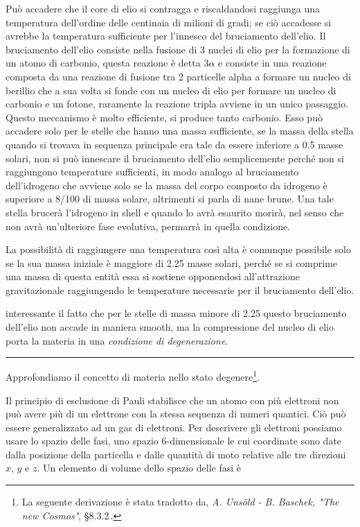 Può accadere che il core di elio si contragga e riscaldandosi raggiunga una temperatura dell'ordine delle centinaia di milioni di gradi; se ciò accadesse si avrebbe la temperatura sufficiente per l'innesco del bruciamento dell'elio. Il bruciamento dell'elio consiste nella fusione di 3 nuclei di elio per la formazione di un atomo di carbonio, questa reazione è detta $3 \alpha$ e consiste in una reazione composta da una reazione di fusione tra 2 particelle alpha a formare un nucleo di berillio che a sua volta si fonde con un nucleo di elio per formare un nucleo di carbonio e un fotone, raramente la reazione tripla avviene in un unico passaggio. Questo meccanismo è molto efficiente, si produce tanto carbonio. Esso può accadere solo per le stelle che hanno una massa sufficiente, se la massa della stella quando si trovava in sequenza principale era tale da essere inferiore a 0.5 masse solari, non si può innescare il bruciamento dell'elio semplicemente perché non si raggiungono temperature sufficienti, in modo analogo al bruciamento dell'idrogeno che avviene solo se la massa del corpo composto da idrogeno è superiore a 8/100 di massa solare, altrimenti si parla di nane brune. Una tale stella brucerà l'idrogeno in shell e quando lo avrà esaurito morirà, nel senso che non avrà un'ulteriore fase evolutiva, permarrà in quella condizione.

La possibilità di raggiungere una temperatura così alta è comunque possibile solo se la sua massa iniziale è maggiore di 2.25 masse solari, perché se si comprime una massa di questa entità essa si sostiene opponendosi all'attrazione gravitazionale raggiungendo le temperature necessarie per il bruciamento dell'elio.

\E interessante il fatto che per le stelle di massa minore di 2.25 questo bruciamento dell'elio non accade in maniera smooth, ma la compressione del nucleo di elio porta la materia in una \textit{condizione di degenerazione}.

\rule[7pt]{\linewidth}{0.4pt}

Approfondiamo il concetto di materia nello stato degenere\footnote{La seguente derivazione è stata tradotto da, \textit{A. Uns\"{o}ld - B. Baschek, "The new Cosmos"}, \S 8.3.2\,.}.

Il principio di esclusione di Pauli stabilisce che un atomo con più elettroni non può avere più di un elettrone con la stessa sequenza di numeri quantici. Ciò può essere generalizzato ad un gas di elettroni. Per descrivere gli elettroni possiamo usare lo spazio delle fasi, uno spazio 6-dimensionale le cui coordinate sono date dalla posizione della particella e dalle quantità di moto relative alle tre direzioni $x$, $y$ e $z$. Un elemento di volume dello spazio delle fasi è

